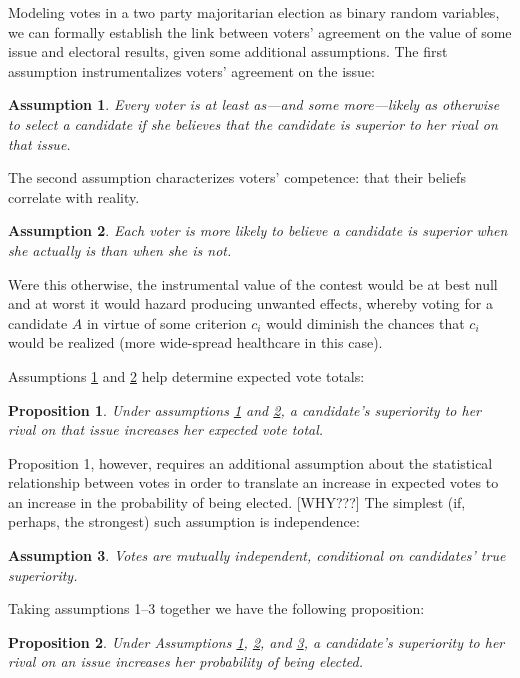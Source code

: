 \documentclass[11pt]{article}
\newtheorem{prop}{Proposition}
\newtheorem{ass}{Assumption}
\begin{document}
Modeling votes in a two party majoritarian election as
binary random variables, we can formally establish the link between voters' agreement on the value of some issue and electoral results, given some additional assumptions.
The first assumption instrumentalizes voters' agreement on the issue:
\begin{ass}\label{ass:preference}
Every voter is at least as---and some more---likely as otherwise to select a candidate if she believes  that the candidate is superior to her rival on that issue.
\end{ass}
The second assumption characterizes voters' competence: that their beliefs correlate with reality.
\begin{ass}\label{ass:belief}%
Each voter is more likely to believe a candidate is
          superior when she actually is than when she is not.
\end{ass}
Were this otherwise, the instrumental value of the contest would be at best null and at worst it would hazard producing unwanted effects, whereby voting for a candidate $A$ in virtue of some criterion $c_i$ would diminish the chances that $c_i$ would be realized (more wide-spread healthcare in this case).

Assumptions \ref{ass:preference} and \ref{ass:belief} help determine expected vote totals:
\begin{prop}\label{prop:voteTotal}
Under assumptions \ref{ass:preference} and \ref{ass:belief},
a candidate's superiority to her rival on that issue increases her expected vote total.
\end{prop}
Proposition 1, however, requires an additional assumption about the statistical relationship between votes in order to translate an increase in expected votes to an increase in the probability of being elected. [WHY???]
The simplest (if, perhaps, the strongest) such assumption is independence:
\begin{ass}\label{ass:independent}
Votes are mutually independent, conditional on candidates' true superiority.
\end{ass}
Taking assumptions 1--3 together we have the following proposition:
\begin{prop}
Under Assumptions \ref{ass:preference}, \ref{ass:belief}, and \ref{ass:independent},
a candidate's superiority to her rival on an issue increases her probability of being elected.
\end{prop}
\end{document}
